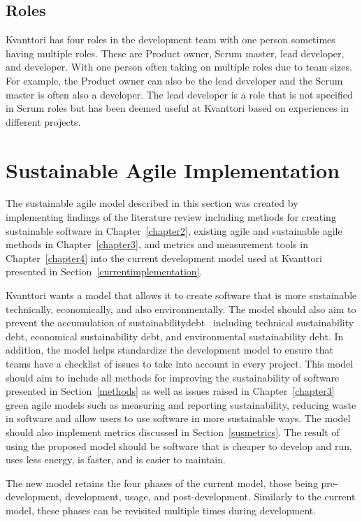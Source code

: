 \subsection{Roles}
Kvanttori has four roles in the development team with one person sometimes having multiple roles. These are Product owner, Scrum master, lead developer, and developer. With one person often taking on multiple roles due to team sizes. For example, the Product owner can also be the lead developer and the Scrum master is often also a developer. The lead developer is a role that is not specified in Scrum roles but has been deemed useful at Kvanttori based on experiences in different projects.

\section{Sustainable Agile Implementation}\label{susimplementation}
The sustainable agile model described in this section was created by implementing findings of the literature review including methods for creating sustainable software in Chapter~\ref{chapter2}, existing agile and sustainable agile methods in Chapter~\ref{chapter3}, and metrics and measurement tools in Chapter~\ref{chapter4} into the current development model used at Kvanttori presented in Section~\ref{currentimplementation}.

Kvanttori wants a model that allows it to create software that is more sustainable technically, economically, and also environmentally. The model should also aim to prevent the accumulation of \gls{sustainabilitydebt}~\cite{sustainabilitydebt} including technical sustainability debt, economical sustainability debt, and environmental sustainability debt. In addition, the model helps standardize the development model to ensure that teams have a checklist of issues to take into account in every project. This model should aim to include all methods for improving the sustainability of software presented in Section~\ref{methods} as well as issues raised in Chapter~\ref{chapter3} green agile models such as measuring and reporting sustainability, reducing waste in software and allow users to use software in more sustainable ways. The model should also implement metrics discussed in Section~\ref{susmetrics}. The result of using the proposed model should be software that is cheaper to develop and run, uses less energy, is faster, and is easier to maintain.

The new model retains the four phases of the current model, those being pre-development, development, usage, and post-development. Similarly to the current model, these phases can be revisited multiple times during development.

